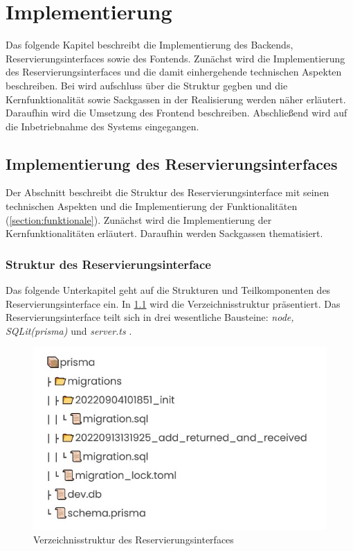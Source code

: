 
\chapter{Implementierung}
\label{chapter-implementierung}
Das folgende Kapitel beschreibt die Implementierung des Backends, Reservierungsinterfaces sowie des
Fontends. Zunächst wird die Implementierung des Reservierungsinterfaces und die damit einhergehende
technischen Aspekten beschreiben. Bei wird aufschluss über die Struktur gegben und die
Kernfunktionalität sowie Sackgassen in der Realisierung werden näher erläutert. Daraufhin wird die
Umsetzung des Frontend beschreiben. Abschließend wird auf die Inbetriebnahme des Systems
eingegangen.


\section{Implementierung des Reservierungsinterfaces}
Der Abschnitt beschreibt die Struktur des Reservierungsinterface mit seinen technischen Aspekten und
die Implementierung der Funktionalitäten (\ref{section:funktionale}). Zunächst wird die
Implementierung der Kernfunktionalitäten erläutert. Daraufhin werden Sackgassen thematisiert.


\subsection{Struktur des Reservierungsinterface}
Das folgende Unterkapitel geht auf die Strukturen und Teilkomponenten des Reservierungsinterface
ein. In \ref{fig:db} wird die Verzeichnisstruktur präsentiert. Das Reservierungsinterface teilt sich
in drei wesentliche Bausteine: \textit{node, SQLit(prisma)} und \textit{server.ts} .

\begin{figure}[h]
  \centering
  \includegraphics[scale=0.7]{Bilder/Db.jpg}
  \caption[Verzeichnisstruktur des Reservierungsinterfaces]{Verzeichnisstruktur des Reservierungsinterfaces}
  \label{fig:db}
\end{figure}

